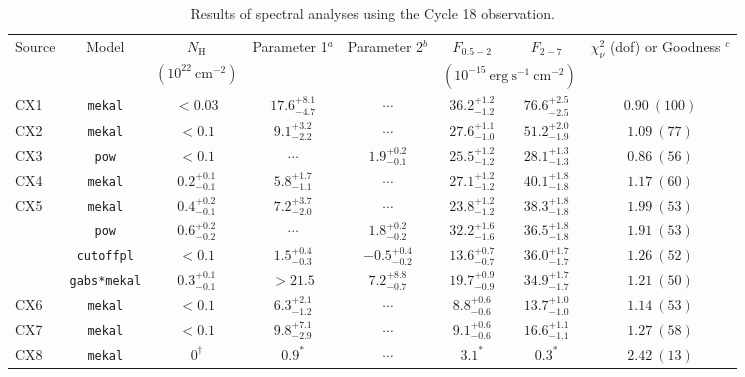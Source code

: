 \documentclass[fleqn,usenatbib]{mnras}
\newcommand\nodata{ ~$\cdots$~ }%
\newcommand{\nd}{\nodata}
\begin{document}
\begin{table*}
    \caption{Results of spectral analyses using the Cycle 18 observation.}
    \label{t:spectral_analyses_51}
    \centering
    \renewcommand{\arraystretch}{1.2}
    \begin{tabular}{lccccccc}
    \hline
       Source  & Model & $N_\mathrm{H}$ & Parameter 1$^a$ & Parameter 2$^b$ & $F_{0.5-2}$ & $F_{2-7}$ &  $\chi_\nu^2$ (dof) or Goodness $^c$\\
               &       & $(10^{22}~\mathrm{cm^{-2}})$ & & & \multicolumn{2}{c}{$(10^{-15}~\mathrm{erg~s^{-1}~cm^{-2}})$} & \\
    \hline
       CX1     & {\tt mekal} & $<0.03$ & $17.6^{+8.1}_{-4.7}$    & \nd & $36.2^{+1.2}_{-1.2}$ & $76.6^{+2.5}_{-2.5}$ & $0.90~(100)$ \\
       CX2     & {\tt mekal} & $<0.1$ & $9.1^{+3.2}_{-2.2}$     & \nd & $27.6^{+1.1}_{-1.0}$ & $51.2^{+2.0}_{-1.9}$ & $1.09~(77)$  \\
       CX3     & {\tt pow}   & $<0.1$ & \nd & $1.9^{+0.2}_{-0.1}$ & $25.5^{+1.2}_{-1.2}$ & $28.1^{+1.3}_{-1.3}$ & $0.86~(56)$  \\
       CX4     & {\tt mekal} & $0.2^{+0.1}_{-0.1}$ & $5.8^{+1.7}_{-1.1}$ & \nd & $27.1^{+1.2}_{-1.2}$ & $40.1^{+1.8}_{-1.8}$ & $1.17~(60)$ \\
       \hline
       \multirow{4}{*}{CX5}     & {\tt mekal} & $0.4^{+0.2}_{-0.1}$ & $7.2^{+3.7}_{-2.0}$ & \nd & $23.8^{+1.2}_{-1.2}$ & $38.3^{+1.8}_{-1.8}$ & $1.99~(53)$ \\
                                & {\tt pow}   & $0.6^{+0.2}_{-0.2}$ & \nd & $1.8^{+0.2}_{-0.2}$ & $32.2^{+1.6}_{-1.6}$ & $36.5^{+1.8}_{-1.8}$ & $1.91~(53)$ \\
                                & {\tt cutoffpl} & $<0.1$ & $1.5^{+0.4}_{-0.3}$ & $-0.5^{+0.4}_{-0.2}$ & $13.6^{+0.7}_{-0.7}$ & $36.0^{+1.7}_{-1.7}$ & $1.26~(52)$ \\
                                & {\tt gabs*mekal} & $0.3^{+0.1}_{-0.1}$ & $>21.5$ & $7.2^{+8.8}_{-0.7}$ & $19.7^{+0.9}_{-0.9}$ & $34.9^{+1.7}_{-1.7}$ & $1.21~(50)$\\
    \hline
       CX6    & {\tt mekal} & $<0.1$ & $6.3^{+2.1}_{-1.2}$ & \nd & $8.8^{+0.6}_{-0.6}$ & $13.7^{+1.0}_{-1.0}$ & $1.14~(53)$ \\
       CX7    & {\tt mekal} & $<0.1$ & $9.8^{+7.1}_{-2.9}$ & \nd & $9.1^{+0.6}_{-0.6}$ & $16.6^{+1.1}_{-1.1}$ & $1.27~(58)$ \\
    \hline
       \multirow{3}{*}{CX8}    & {\tt mekal} & $0^\dag$ & $0.9^\ast$ & \nd & $3.1^\ast$ & $0.3^\ast$ & $2.42~(13)$ \\

\end{tabular}
\end{table*}
\end{document}
